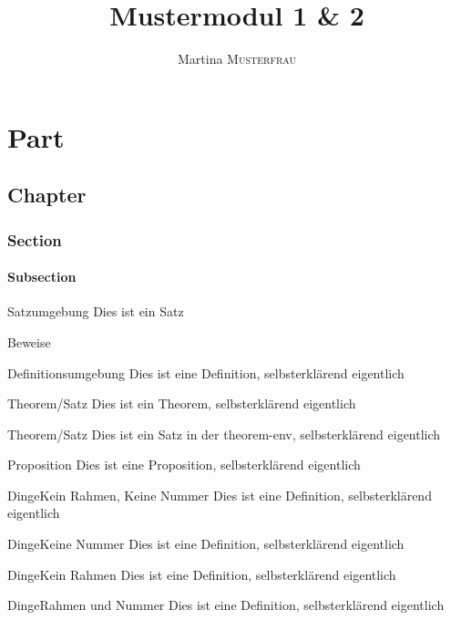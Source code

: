 \documentclass[red, ngerman]{skript}
\author{Martina \textsc{Musterfrau}}
\title{Mustermodul 1 \& 2 \\\subtitleformat{Skript zum Mustermodul Dinge Bla}}
\begin{document}
\maketitle

\tableofcontents

\part{Part}
\chapter{Chapter}
\section{Section}
\subsection{Subsection}
\begin{satz}{Satzumgebung}
	Dies ist ein Satz
\end{satz}
\clearpage
\begin{beweis}
	Beweise
\end{beweis}

\begin{definition}{Definitionsumgebung}
	Dies ist eine Definition, selbsterklärend eigentlich
\end{definition}
\begin{satz}{Theorem/Satz}
	Dies ist ein Theorem, selbsterklärend eigentlich
\end{satz}
\begin{theorem}{Theorem/Satz}
	Dies ist ein Satz in der theorem-env, selbsterklärend eigentlich
\end{theorem}
\begin{proposition}{Proposition}
	Dies ist eine Proposition, selbsterklärend eigentlich
\end{proposition}

\begin{eBox}{Dinge}{Kein Rahmen, Keine Nummer}
	Dies ist eine Definition, selbsterklärend eigentlich
\end{eBox}
\begin{bBox}{Dinge}{Keine Nummer}
	Dies ist eine Definition, selbsterklärend eigentlich
\end{bBox}
\begin{nBox}{Dinge}{Kein Rahmen}
	Dies ist eine Definition, selbsterklärend eigentlich
\end{nBox}
\begin{bnBox}{Dinge}{Rahmen und Nummer}
	Dies ist eine Definition, selbsterklärend eigentlich
\end{bnBox}
\end{document}
